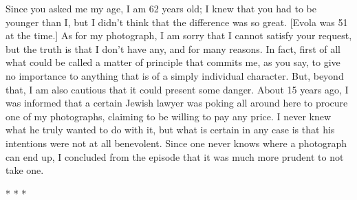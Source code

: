 Since you asked me my age, I am 62 years old; I knew that you had to be younger than I, but I didn't think that the difference was so great. [Evola was 51 at the time.] As for my photograph, I am sorry that I cannot satisfy your request, but the truth is that I don't have any, and for many reasons. In fact, first of all what could be called a matter of principle that commits me, as you say, to give no importance to anything that is of a simply individual character. But, beyond that, I am also cautious that it could present some danger. About 15 years ago, I was informed that a certain Jewish lawyer was poking all around here to procure one of my photographs, claiming to be willing to pay any price. I never knew what he truly wanted to do with it, but what is certain in any case is that his intentions were not at all benevolent. Since one never knows where a photograph can end up, I concluded from the episode that it was much more prudent to not take one.




\begin{center}* * *\end{center}

